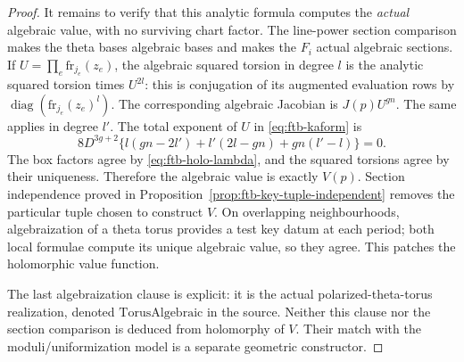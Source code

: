 \begin{proof}
It remains to verify that this analytic formula computes the
\emph{actual} algebraic value, with no surviving chart factor.
The line-power section comparison makes the theta bases
algebraic bases and makes the \(F_i\) actual algebraic sections.
If \(U=\prod_e\mathrm{fr}_{j_e}(z_e)\), the algebraic squared
torsion in degree \(l\) is the analytic squared torsion times
\(U^{2l}\): this is conjugation of its augmented evaluation
rows by \(\operatorname{diag}(\mathrm{fr}_{j_e}(z_e)^l)\).
The corresponding algebraic Jacobian is \(J(p)U^{gn}\).
The same applies in degree \(l'\).
The total exponent of \(U\) in \eqref{eq:ftb-kaform} is
\[
 8D^{3g+2}
 \{l(gn-2l')+l'(2l-gn)+gn(l'-l)\}=0.
\]
The box factors agree by \eqref{eq:ftb-holo-lambda}, and the
squared torsions agree by their uniqueness.  Therefore the
algebraic value is exactly \(V(p)\).
Section independence proved in
Proposition~\ref{prop:ftb-key-tuple-independent} removes the
particular tuple chosen to construct \(V\).
On overlapping neighbourhoods, algebraization of a theta torus
provides a test key datum at each period; both local formulae
compute its unique algebraic value, so they agree.  This patches
the holomorphic value function.

The last algebraization clause is explicit: it is the actual
polarized-theta-torus realization, denoted
\(\mathrm{TorusAlgebraic}\) in the source.  Neither this clause
nor the section comparison is deduced from holomorphy of
\(V\).  Their match with the moduli/uniformization model is
a separate geometric constructor.
\end{proof}

